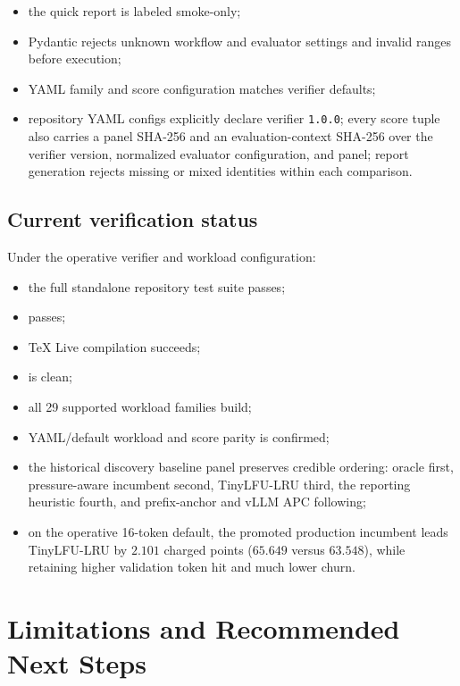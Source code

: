 \documentclass[11pt]{article}
\newcommand{\code}[1]{\texttt{\detokenize{#1}}}
\newcommand{\identifier}[1]{\nolinkurl{#1}}
\begin{document}
\begin{itemize}
  ablation harness preserves its default behavior;
  \item the quick report is labeled smoke-only;
  \item Pydantic rejects unknown workflow and evaluator settings and invalid ranges
  before execution;
  \item YAML family and score configuration matches verifier defaults;
  \item repository YAML configs explicitly declare verifier \identifier{1.0.0};
  every score tuple also carries a panel SHA-256 and an evaluation-context SHA-256
  over the verifier version, normalized evaluator configuration, and panel; report
  generation rejects missing or mixed identities within each comparison.
\end{itemize}

\subsection{Current verification status}

Under the operative verifier and workload configuration:

\begin{itemize}
  \item the full standalone repository test suite passes;
  \item \code{ruff check .} passes;
  \item TeX Live compilation succeeds;
  \item \code{git diff --check} is clean;
  \item all 29 supported workload families build;
  \item YAML/default workload and score parity is confirmed;
  \item the historical discovery baseline panel preserves credible ordering: oracle
  first, pressure-aware incumbent second, TinyLFU-LRU third, the reporting heuristic
  fourth, and prefix-anchor and vLLM APC following;
  \item on the operative 16-token default, the promoted production incumbent leads
  TinyLFU-LRU by \(2.101\) charged points (\(65.649\) versus \(63.548\)), while
  retaining higher validation token hit and much lower churn.
\end{itemize}

\section{Limitations and Recommended Next Steps}
\end{document}
